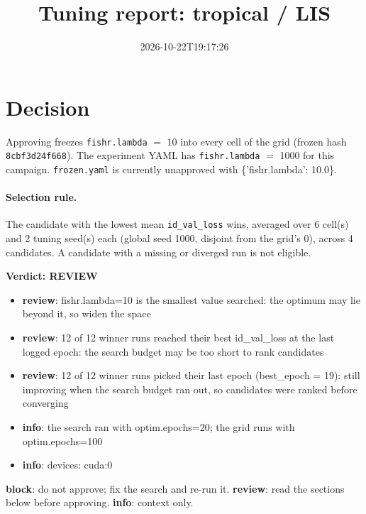 \documentclass[10pt]{article}
\title{Tuning report: tropical / LIS}
\date{2026-10-22T19:17:26}
\begin{document}
\maketitle

\section{Decision}
Approving freezes
\texttt{fishr.lambda} $=$ 10 into every cell of the grid (frozen hash \texttt{8cbf3d24f668}).
The experiment YAML has
\texttt{fishr.lambda} $=$ 1000 for this campaign.
\texttt{frozen.yaml} is currently unapproved with \{'fishr.lambda': 10.0\}.

\paragraph{Selection rule.} The candidate with the lowest mean \texttt{id\_val\_loss} wins, averaged over 6 cell(s) and 2 tuning seed(s) each (global seed 1000, disjoint from the grid's 0), across 4 candidates. A candidate with a missing or diverged run is not eligible.

\begin{framed}
\noindent\textbf{Verdict: \textcolor{orange!85!black}{REVIEW}}
\begin{itemize}\setlength\itemsep{0pt}
\item \textbf{review}: fishr.lambda=10 is the smallest value searched: the optimum may lie beyond it, so widen the space
\item \textbf{review}: 12 of 12 winner runs reached their best id\_val\_loss at the last logged epoch: the search budget may be too short to rank candidates
\item \textbf{review}: 12 of 12 winner runs picked their last epoch (best\_epoch = 19): still improving when the search budget ran out, so candidates were ranked before converging
\item \textbf{info}: the search ran with optim.epochs=20; the grid runs with optim.epochs=100
\item \textbf{info}: devices: cuda:0
\end{itemize}
\end{framed}
\noindent\textbf{block}: do not approve; fix the search and re-run it. \textbf{review}: read the sections below before approving. \textbf{info}: context only.
\end{document}
